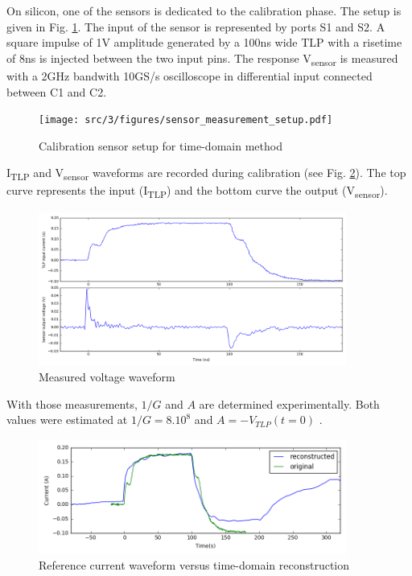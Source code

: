 On silicon, one of the sensors is dedicated to the calibration phase.
The setup is given in Fig. \ref{fig:calibration-sensor}.
The input of the sensor is represented by ports S1 and S2.
A square impulse of 1V amplitude generated by a 100ns wide TLP with a risetime of 8ns is injected between the two input pins.
The response V\textsubscript{sensor} is measured with a 2GHz bandwith 10GS/s oscilloscope in differential input connected between C1 and C2.

\begin{figure}[!h]
  \centering
  \texttt{[image: src/3/figures/sensor\_measurement\_setup.pdf]}
  \caption{Calibration sensor setup for time-domain method}
  \label{fig:calibration-sensor}
\end{figure}

I\textsubscript{TLP} and V\textsubscript{sensor} waveforms are recorded during calibration (see Fig. \ref{fig:measurement-nfs}).
The top curve represents the input (I\textsubscript{TLP}) and the bottom curve the output (V\textsubscript{sensor}).

\begin{figure}[!h]
  \centering
  \includegraphics[width=0.9\textwidth]{src/3/figures/measured_waveform.png}
  \caption{Measured voltage waveform}
  \label{fig:measurement-nfs}
\end{figure}

With those measurements, $1/G$ and $A$ are determined experimentally.
Both values were estimated at $1/G = 8.10^8$ and $A = -V_{TLP}(t = 0)$ .

\begin{figure}[!h]
  \centering
  \includegraphics[width=0.9\textwidth]{src/3/figures/time_domain_vs_ref.png}
  \caption{Reference current waveform versus time-domain reconstruction}
  \label{fig:time-domain-reconstructed}
\end{figure}

